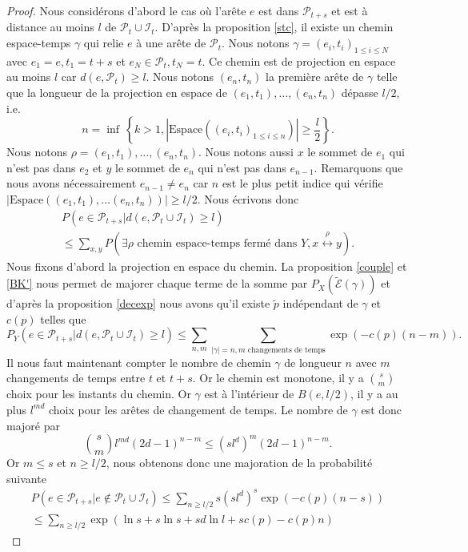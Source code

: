 \documentclass[titlepage,a4paper,12pt]{article}
\newcounter{th}
\newcounter{propo}
\begin{document}
\begin{proof}
Nous considérons d'abord le cas où l'arête $e$ est dans $\mathcal{P}_{t+s}$ et est à distance au moins $l$ de $\mathcal{P}_t\cup \mathcal{I}_t$.
D'après la proposition \ref{stc}, il existe un chemin espace-temps $\gamma$ qui relie $e$ à une arête de $\mathcal{P}_t$. Nous notons $\gamma= (e_i,t_i)_{1\leqslant i \leqslant N}$ avec $e_1 = e, t_1 = t+s$ et $e_N\in \mathcal{P}_t, t_N = t$. Ce chemin est de projection en espace au moins $l$ car $d(e,\mathcal{P}_t)\geqslant l$. Nous notons $(e_n,t_n)$ la première arête de $\gamma$ telle que la longueur de la projection en espace de $(e_1,t_1),\dots,(e_n,t_n)$ dépasse $l/2$, i.e. 
$$ n = \inf\,\left\lbrace k>1, |\mathrm{Espace}((e_i,t_i)_{1\leqslant i \leqslant n})| \geqslant \frac{l}{2} \right\rbrace.
$$
Nous notons $\rho = (e_1,t_1),\dots,(e_n,t_n)$. Nous notons aussi $x$ le sommet de $e_1$ qui n'est pas dans $e_2$ et $y$ le sommet de $e_n$ qui n'est pas dans $e_{n-1}$. Remarquons que nous avons nécessairement $e_{n-1} \neq e_n$ car $n$ est le plus petit indice qui vérifie $|\mathrm{Espace}((e_1,t_1),\dots(e_n,t_n))|\geqslant l/2$. 
Nous écrivons donc 
\begin{multline*} P(e\in \mathcal{P}_{t+s}|d(e,\mathcal{P}_t\cup \mathcal{I}_t)\geqslant l) \\\leqslant \sum_{x,y}P( \exists \rho \text{ chemin espace-temps fermé dans }Y, x\overset{\rho}{\longleftrightarrow} y).
\end{multline*}
Nous fixons d'abord la projection en espace du chemin. La proposition \ref{couple} et \ref{BK'} nous permet de majorer chaque terme de la somme par $P_X(\widetilde{\mathcal{E}}(\gamma))$ et d'après la proposition \ref{decexp} nous avons qu'il existe $\widetilde{p}$ indépendant de $\gamma$ et $c(p)$ telles que 
$$P_Y(e\in \mathcal{P}_{t+s}|d(e,\mathcal{P}_t\cup \mathcal{I}_t)\geqslant l) \leqslant \sum_{n,m}\sum_{|\gamma| = n, m \text{ changements de temps}} \exp(-c(p)(n-m)).
$$
Il nous faut maintenant compter le nombre de chemin $\gamma$ de longueur $n$ avec $m$ changements de temps entre $t$ et $t+s$. Or le chemin est monotone, il y a $\displaystyle s \choose m$ choix pour les instants du chemin. Or $\gamma$ est à l'intérieur de $B(e,l/2)$, il y a au plus $l^{md}$ choix pour les arêtes de changement de temps. Le nombre de $\gamma$ est donc majoré par
$$ {s\choose m} l^{md} (2d-1)^{n-m}\leqslant (sl^d)^m(2d-1)^{n-m}.
$$
Or $m\leqslant s$ et $n\geqslant l/2$, nous obtenons donc une majoration de la probabilité suivante
\begin{multline*}P(e\in \mathcal{P}_{t+s}|e\notin \mathcal{P}_t\cup \mathcal{I}_t) \leqslant \sum_{n\geqslant l/2}s(sl^d)^s\exp(-c(p)(n-s))\\\leqslant \sum_{n\geqslant l/2} \exp(\ln s+s\ln s+sd\ln l +sc(p)-c(p)n)

\end{multline*}
\end{proof}
\end{document}
